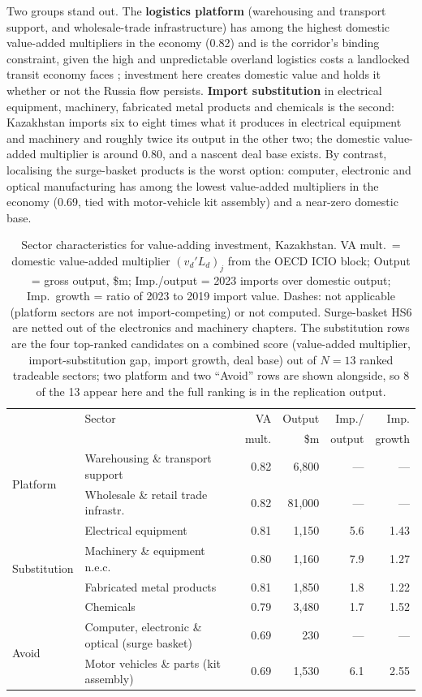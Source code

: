 \documentclass[12pt]{article}
\begin{document}
Two groups stand out. The \textbf{logistics platform} (warehousing and transport support, and
wholesale-trade infrastructure) has among the highest domestic value-added multipliers in the
economy (0.82) and is the corridor's binding constraint, given the high and unpredictable
overland logistics costs a landlocked transit economy faces \citep{arvis2010landlocked};
investment here creates
domestic value and holds it whether or not the Russia flow persists. \textbf{Import substitution} in
electrical equipment, machinery, fabricated metal products and chemicals is the second:
Kazakhstan imports six to eight times what it produces in electrical equipment and machinery
and roughly twice its output in the other two; the domestic value-added multiplier is around
0.80, and a nascent deal base exists. By contrast, localising
the surge-basket products is the worst option: computer, electronic and optical manufacturing
has among the lowest value-added multipliers in the economy (0.69, tied with motor-vehicle kit
assembly) and a near-zero domestic base.

\begin{table}[t]
\centering
\caption{Sector characteristics for value-adding investment, Kazakhstan. VA mult.\ =
domestic value-added multiplier $(v_d' L_d)_j$ from the OECD ICIO block; Output = gross output,
\$m; Imp./output = 2023 imports over domestic output; Imp.\ growth = ratio of 2023 to 2019
import value. Dashes: not applicable (platform sectors are not import-competing) or not
computed. Surge-basket HS6 are netted out of the electronics and machinery chapters. The
substitution rows are the four top-ranked candidates on a combined score (value-added
multiplier, import-substitution gap, import growth, deal base) out of $N = 13$ ranked
tradeable sectors; two platform and two ``Avoid'' rows are shown alongside, so 8 of the 13
appear here and the full ranking is in the replication output.}
\label{tab:priority}
\small
\begin{tabular}{@{}p{1.5cm}p{5.4cm}rrrr@{}}
\toprule
& Sector & VA & Output & Imp./ & Imp. \\
& & mult. & \$m & output & growth \\
\midrule
\multirow{2}{1.5cm}{Platform}
 & Warehousing \& transport support & 0.82 & 6{,}800 & --- & --- \\
 & Wholesale \& retail trade infrastr. & 0.82 & 81{,}000 & --- & --- \\[2pt]
\multirow{4}{1.5cm}{Substi\-tution}
 & Electrical equipment & 0.81 & 1{,}150 & 5.6 & 1.43 \\
 & Machinery \& equipment n.e.c. & 0.80 & 1{,}160 & 7.9 & 1.27 \\
 & Fabricated metal products & 0.81 & 1{,}850 & 1.8 & 1.22 \\
 & Chemicals & 0.79 & 3{,}480 & 1.7 & 1.52 \\[2pt]
\multirow{2}{1.5cm}{Avoid}
 & Computer, electronic \& optical (surge basket) & 0.69 & 230 & --- & --- \\
 & Motor vehicles \& parts (kit assembly) & 0.69 & 1{,}530 & 6.1 & 2.55 \\
\bottomrule
\end{tabular}
\end{table}
\end{document}
